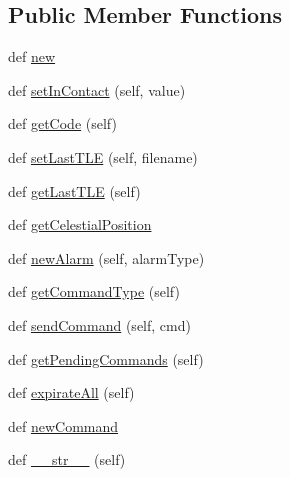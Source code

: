 \subsection*{Public Member Functions}
\begin{DoxyCompactItemize}
\item 
def \hyperlink{class_ground_segment_1_1models_1_1_satellite_1_1_satellite_a2f064a4aef74f3fd6808147eb36bfaea}{new}
\item 
def \hyperlink{class_ground_segment_1_1models_1_1_satellite_1_1_satellite_a809a4f9f567603df662192d40a4147c2}{set\+In\+Contact} (self, value)
\item 
def \hyperlink{class_ground_segment_1_1models_1_1_satellite_1_1_satellite_a514073889905f270022336e51caf420e}{get\+Code} (self)
\item 
def \hyperlink{class_ground_segment_1_1models_1_1_satellite_1_1_satellite_a53156f48e5812862d08044c43a6bfb18}{set\+Last\+T\+L\+E} (self, filename)
\item 
def \hyperlink{class_ground_segment_1_1models_1_1_satellite_1_1_satellite_ae2cd61983a5d3797c175b719ced66dd5}{get\+Last\+T\+L\+E} (self)
\item 
def \hyperlink{class_ground_segment_1_1models_1_1_satellite_1_1_satellite_ae29d261034411899685e71315d36411a}{get\+Celestial\+Position}
\item 
def \hyperlink{class_ground_segment_1_1models_1_1_satellite_1_1_satellite_aeaa5108842200cd7d39e9fc0546d09a5}{new\+Alarm} (self, alarm\+Type)
\item 
def \hyperlink{class_ground_segment_1_1models_1_1_satellite_1_1_satellite_a73f1ac4d056566b7f3bf97e247e67c23}{get\+Command\+Type} (self)
\item 
def \hyperlink{class_ground_segment_1_1models_1_1_satellite_1_1_satellite_a52677e9afce3af3f71a06b7f4dd98041}{send\+Command} (self, cmd)
\item 
def \hyperlink{class_ground_segment_1_1models_1_1_satellite_1_1_satellite_a996d22d63af5cc9d9323e8fba7d52c82}{get\+Pending\+Commands} (self)
\item 
def \hyperlink{class_ground_segment_1_1models_1_1_satellite_1_1_satellite_ae28c9b4a90e0150462cc59ced3dfe882}{expirate\+All} (self)
\item 
def \hyperlink{class_ground_segment_1_1models_1_1_satellite_1_1_satellite_ae6307cbbfbd728d4f02515186fb8fc08}{new\+Command}
\item 
def \hyperlink{class_ground_segment_1_1models_1_1_satellite_1_1_satellite_a0256a218df8e5fe93b8d2189e5c55849}{\+\_\+\+\_\+str\+\_\+\+\_\+} (self)
\end{DoxyCompactItemize}
